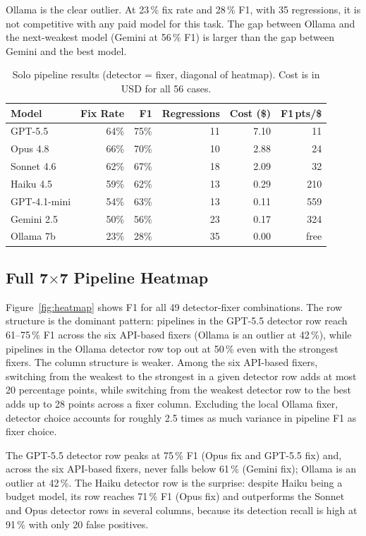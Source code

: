 \documentclass[12pt]{article}
\begin{document}
Ollama is the clear outlier. At 23\,\% fix rate and 28\,\% F1, with 35
regressions, it is not competitive with any paid model for this task. The gap
between Ollama and the next-weakest model (Gemini at 56\,\% F1) is larger than
the gap between Gemini and the best model.

\begin{table}[H]
  \centering
  \caption{Solo pipeline results (detector = fixer, diagonal of heatmap).
  Cost is in USD for all 56 cases.}
  \label{tab:solo}
  \begin{tabular}{lrrrrr}
    \toprule
    Model & Fix Rate & F1 & Regressions & Cost (\$) & F1\,pts/\$ \\
    \midrule
    GPT-5.5        & 64\% & 75\% & 11 & 7.10  & 11   \\
    Opus 4.8       & 66\% & 70\% & 10 & 2.88  & 24   \\
    Sonnet 4.6     & 62\% & 67\% & 18 & 2.09  & 32   \\
    Haiku 4.5      & 59\% & 62\% & 13 & 0.29  & 210  \\
    GPT-4.1-mini   & 54\% & 63\% & 13 & 0.11  & 559  \\
    Gemini 2.5     & 50\% & 56\% & 23 & 0.17  & 324  \\
    Ollama 7b      & 23\% & 28\% & 35 & 0.00  & free \\
    \bottomrule
  \end{tabular}
\end{table}

\subsection{Full 7$\times$7 Pipeline Heatmap}

Figure~\ref{fig:heatmap} shows F1 for all 49 detector-fixer combinations.
The row structure is the dominant pattern: pipelines in the GPT-5.5 detector
row reach 61--75\,\% F1 across the six API-based fixers (Ollama is an outlier
at 42\,\%), while pipelines in the Ollama detector row top out at 50\,\% even
with the strongest fixers. The column structure is weaker. Among the six
API-based fixers, switching from the weakest to the strongest in a given
detector row adds at most 20 percentage points, while switching from the
weakest detector row to the best adds up to 28 points across a fixer column.
Excluding the local Ollama fixer, detector choice accounts for roughly 2.5
times as much variance in pipeline F1 as fixer choice.

The GPT-5.5 detector row peaks at 75\,\% F1 (Opus fix and GPT-5.5 fix)
and, across the six API-based fixers, never falls below 61\,\% (Gemini fix);
Ollama is an outlier at 42\,\%. The Haiku
detector row is the surprise: despite Haiku being a budget model, its row
reaches 71\,\% F1 (Opus fix) and outperforms the Sonnet and Opus detector
rows in several columns, because its detection recall is high at 91\,\% with
only 20 false positives.
\end{document}
